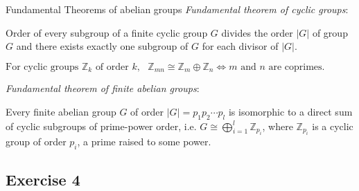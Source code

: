 \documentclass{beamer}
\newcommand\italictext[1]{\textcolor{italics}{\textit{#1}}}
\begin{document}
\begin{frame}{Fundamental Theorems of abelian groups}
    \italictext{Fundamental theorem of cyclic groups}:
    \begin{theorem}
        Order of every subgroup of a finite cyclic group $G$ divides the order $\lvert G\rvert$ of group $G$ and there exists exactly one subgroup of $G$ for each divisor of $\lvert G\rvert$. 
    \end{theorem}
    \begin{lemma}
        $\text{For cyclic groups }\mathbb{Z}_k\text{ of order }k,\text{ }\mathbb{Z}_{mn}\cong\mathbb{Z}_m\oplus\mathbb{Z}_n\Leftrightarrow m \text{ and } n\text{ are coprimes.}$
    \end{lemma}
    \italictext{Fundamental theorem of finite abelian groups}:
    \begin{theorem}
        Every finite abelian group $G$ of order $\lvert G\rvert=p_1p_2\cdots p_l$ is isomorphic to a direct sum of cyclic subgroups of prime-power order, i.e. $G\cong\bigoplus\limits_{i=1}^{l} \mathbb{Z}_{p_i}$, where $\mathbb{Z}_{p_i}$ is a cyclic group of order $p_i$, a prime raised to some power.
    \end{theorem}
\end{frame}

\subsection{Exercise 4}
\end{document}
